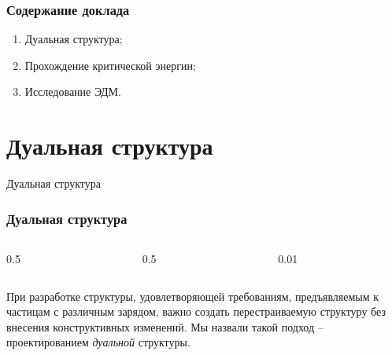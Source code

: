 
\begin{frame}
	\frametitle{Содержание доклада}
	\begin{enumerate}
	\item Дуальная структура;\newline
	\item Прохождение критической энергии;\newline
	\item Исследование ЭДМ.
	\end{enumerate}
\end{frame}
\section{Дуальная структура}
\begin{frame}
	\centering \Large{Дуальная структура}
\end{frame}
\begin{frame}
	\frametitle{Дуальная структура}
	\begin{columns}
		\begin{column}{0.5\textwidth}
			\raggedright
		\end{column}
		\hfill
		\begin{column}{0.5\textwidth}
			\raggedright
		\end{column}
		\begin{column}{0.01\textwidth}
		\end{column}
	\end{columns}
	\vspace{2em}
	При разработке структуры, удовлетворяющей требованиям, предъявляемым к частицам с различным зарядом, важно создать перестраиваемую структуру без внесения конструктивных изменений. Мы назвали такой подход -- проектированием \textit{дуальной} структуры.	
\end{frame}
